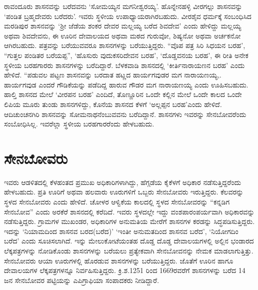 ರಾವಂದೂರು ಶಾಸನವನ್ನು ಬರೆದವನು ‘ಸೋಮಯ್ಯನ ಮಗನೀಶ್ವರಯ್ಯ’. ಹೊನ್ನೇನಹಳ್ಳಿ ವೀರಗಲ್ಲು ಶಾಸನವನ್ನು ‘ಪಂಡಿತ ಬ್ರಹ್ಮದೇವರು ಬರೆದರು’. ಇವರು ಸ್ಥಳೀಯ ಉಪಾಧ್ಯಾಯರಾಗಿರಬಹುದು. ವೀರಶೈವ ಧರ್ಮಕ್ಕೆ ಸಂಬಂಧಿಸಿದ ಮರಡಿಪುರ ಶಾಸನವನ್ನು ‘ಶ‍್ರೀ ಜೆಡೆಯ ಶಂಕರ ದೇವರ ಮಲ್ಲಯ್ಯ ಬರೆದ ಶಿವದೇವ’ ಎಂದು ಹೇಳಿದ್ದು ಮಲ್ಲಯ್ಯ ಅಥವಾ ಶಿವದೇವನು, ಈ ಊರಿನ ದೇವಾಲಯದ ಅಥವಾ ಮಠದ ಗುರುವೋ, ಶಿಷ್ಯನೋ ಅಥವಾ ಅರ್ಚಕನೋ ಆಗಿರಬಹುದು. ಪತ್ರವನ್ನು ಬರೆಯುವವರೂ ಶಾಸನಗಳನ್ನು ಬರೆಯುತ್ತಿದ್ದರು. “ವೊಪ ಪತ್ರ ಸಿರಿ ಸಿಧಯನ ಬರಹ’, “ಗುತ್ತಲ ಪಂಡಿತರ ಬರೆಯಪ್ಪ”, ‘ಹೊಸುರು ವುದುಕಸರಿದೇವನ ಬರಹ’, ‘ದೊಡ್ಡವನಯ ಬರಹ’, ಈ ರೀತಿ ಅನೇಕ ಸ್ಥಳೀಯ ಬರಹಗಾರರು ಶಾಸನಗಳನ್ನು ಬರೆದಿದ್ದಾರೆ. ಬೆಳಕವಾಡಿ ಶಾಸನದಲ್ಲಿ ‘ಕೀರ್ತಿನಾರಾಯಣನ ಬರಹ’ ಎಂದು ಹೇಳಿದೆ. “ಪಡುವಲ ಪಟ್ಟಣ ಶಾಸನವನ್ನು ಬರದಾತ ಹಟ್ಣದ ಹಾರ್ಯಗವುಡರ ಮಗ ನಾರಾಯಣಯ್ಯ,. ಹಾರ್ಯಗವುಡ ಎಂದರೆ ಗೌಡಿಕೆಯನ್ನು ಪಡೆದಿದ್ದ ಹಾರುವ ಗೌಡರ ಮಗ ನಾರಾಯಣಯ್ಯ ಎಂದು ಊಹಿಸಬಹುದು. ಹಾಲ್ತಿ ಶಾಸನದ ಮೇಲೆ ‘ವೀರಪನ ಬರಹ’ ಎಂದಿದೆ, ತೊಣ್ಣೂರಿನ ಒಂದೇ ಕಲ್ಲಿನ ಮೇಲೆ ಒಂದೇ ಕಾಲದ ಒಂದೇ ಲಿಪಿಯ ಮೂರು ತುಂಡು ಶಾಸನಗಳಿದ್ದು, ಕೊನೆಯ ಶಾಸನದ ಕೆಳಗೆ ‘ಅಲ್ಲಪ್ಪನ ಬರಹ’ಎಂದು ಹೇಳಿದೆ. ಆದಿಚುಂಚನಗಿರಿ ಶಾಸನವನ್ನು ಸೋಮನಾಥನೆಂಬುವವನು ಬರೆದಿದ್ದಾನೆ. ಶಾಸನಗಳು ಇವರನ್ನು ಸೇನಬೋವರೆಂದು ಸಂಬೋಧಿಸಿಲ್ಲ. ಇವರೆಲ್ಲಾ ಸ್ಥಳೀಯ ಬರಹಗಾರರೆಂದು ಹೇಳಬಹುದು.


\section{ಸೇನಬೋವರು}

ಇವರು ಆಡಳಿತದಲ್ಲಿ ಕೆಳಹಂತದ ಪ್ರಮುಖ ಅಧಿಕಾರಿಗಳಾಗಿದ್ದು, ಹೆಗ್ಗಡೆಯ ಕೈಕೆಳಗೆ ಅಧಿಕಾರ ನಡೆಸುತ್ತಿದ್ದರೆಂದು ಹೇಳಬಹುದು. ಪ್ರತಿ ಊರಿಗೆ ಅಥವಾ ಹಲವಾರು ಊರುಗಳಿಗೆ ಒಬ್ಬರು ಸೇನಬೋವರು ಇರುತ್ತಿದ್ದರು. ಕೆಲವರನ್ನು ಸ್ಥಳದ ಸೇನಬೋವರು ಎಂದು ಹೇಳಿದೆ. ಚೋಳರ ಆಳ್ವಿಕೆಯ ಕಾಲದಲ್ಲಿ ಸ್ಥಳದ ಸೇನಬೋವರನ್ನು “ಕನ್ನಡಿಗ ಸೇನಬೋವ” ಎಂದು ಅರಕೆರೆ ಶಾಸನದಲ್ಲಿ ಕರೆದಿದೆ. ಇವರು ಸ್ಥಳದಲ್ಲೇ ಇದ್ದು ವಂಶಪಾರಂಪರ್ಯವಾಗಿ ಅಧಿಕಾರವನ್ನು ನಡೆಸುತ್ತಿದ್ದರು. ಗ್ರಾಮಗಳ ಮುಖಂಡರ, ಅಧಿಕಾರಿಗಳ ಅನುಮತಿಯ ಮೇರೆಗೆ ಶಾಸನಗಳ ಕರಡನ್ನು ಸಿದ್ಧಪಡಿಸುತ್ತಿದ್ದರು. ಇದನ್ನು ‘ನಿಯಾಮದಿಂದ ಶಾಸನವ ಬರದ(ಬರೆದ)’ ‘ಇಂತೀ ಅನುಮತದಿಂದ ಶಾಸನವ ಬರೆದ’, ‘ನಿಯೋಗದಿಂ ಬರೆದ’ ಎಂದು ಸೂಚಿಸಲಾಗಿದೆ. ಇನ್ನು ಮೇಲುಕೋಟೆಯಂತಹ ದೊಡ್ಡ ದೊಡ್ಡ ದೇವಾಲಯಗಳಲ್ಲಿ ಅಲ್ಲಿನ ಭಂಡಾರದ ಲೆಕ್ಕಪತ್ರಗಳನ್ನು ನೋಡಿಕೊಂಡು ಶಾಸನಗಳನ್ನು ಬರೆಯಲು ಪ್ರತ್ಯೇಕವಾಗಿ ಸೇನಬೋವನನ್ನು ನೇಮಕ ಮಾಡಲಾಗುತ್ತಿತ್ತು. ಸೇನಬೋವರು ಆಯಾ ಊರುಗಳಲ್ಲಿ ಹೊರಡುವ ಶಾಸನಗಳನ್ನು ಬರೆಯು\-ತ್ತಿದ್ದರು. ಜೊತೆಗೆ ಊರಿನ ಹಾಗೂ ದೇವಾಲಯಗಳ ಲೆಕ್ಕಪತ್ರಗಳನ್ನೂ ನಿರ್ವಹಿಸುತ್ತಿದ್ದರು. ಕ್ರಿ.ಶ.1251 ರಿಂದ 1669ರವರೆಗೆ ಶಾಸನಗಳನ್ನು ಬರೆದ 14 ಜನ ಸೇನಬೋವರ ಪಟ್ಟಿಯನ್ನು ಎಪಿಗ್ರಾಫಿಯಾ ಸಂಪಾದಕರು ನೀಡಿದ್ದಾರೆ.

